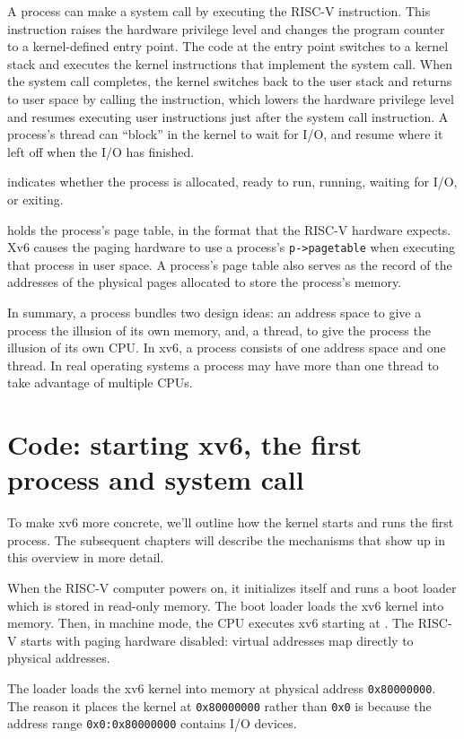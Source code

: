 A process can make a system call by executing the RISC-V 
instruction. This instruction raises the hardware privilege level and
changes the program counter to a kernel-defined entry point.  The code
at the entry point switches to a kernel stack and executes the kernel
instructions that implement the system call.  When the system call
completes, the kernel switches back to the user stack and returns to
user space by calling the  instruction, which lowers
the hardware privilege level and resumes executing user instructions
just after the system call instruction.  A process's thread can
``block'' in the kernel to wait for I/O, and resume where it left off
when the I/O has finished.

indicates whether the process is allocated, ready
to run, running, waiting for I/O, or exiting.

holds the process's page table, in the format
that the RISC-V hardware expects.
Xv6 causes the paging hardware to use a process's
\lstinline{p->pagetable}
when executing that process in user space.
A process's page table also serves as the record of the
addresses of the physical pages allocated to store the process's
memory.

In summary, a process bundles two design ideas: an address space to
give a process the illusion of its own memory, and, a thread, to give
the process the illusion of its own CPU.  In xv6, a process consists
of one address space and one thread.  In real operating systems a
process may have more than one thread to take advantage of multiple CPUs.

\section{Code: starting xv6, the first process and system call}
To make xv6 more concrete, we'll outline how the kernel starts and
runs the first process. The subsequent chapters will describe the
mechanisms that show up in this overview in more detail.

When the RISC-V computer powers on, it initializes
itself and runs a boot loader which is stored in read-only
memory.  The boot loader loads the xv6 kernel into memory.  Then, in
machine mode, the CPU executes xv6 starting at
.
The RISC-V starts with paging hardware disabled:
virtual addresses map directly to physical addresses.

The loader loads the xv6 kernel into memory at physical address
\texttt{0x80000000}.
The reason it places the kernel at
\texttt{0x80000000}
rather than
\texttt{0x0}
is because the address range
\texttt{0x0:0x80000000}
contains I/O devices.


